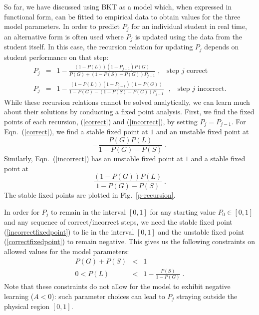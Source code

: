 \documentclass{acmlarge-edm}
\begin{document}
So far, we have discussed using BKT as a model which, when expressed
in functional form, can be fitted to empirical data to obtain values
for the three model parameters.  In order to predict $P_j$ for an
individual student in real time, an alternative form is often used where
$P_j$ is updated using the data from the student itself.
In this case, the recursion relation for updating $P_j$ 
\cite{corbett_knowledge_1994,baker_more_2008} depends on
student performance on that step:
%
\begin{eqnarray}
       P_j &=&
       1-\frac{\left(1-P(L)\right)\left(1-P_{j-1}\right)P(G)}{P(G)+\left(1-P(S)-P(G)\right)
         P_{j-1}}  \mbox{~,~~ step $j$ correct} \label{correct}\\
       P_j &=& 1-\frac{\left(1-P(L)\right)\left(1-P_{j-1}\right)\left(1-P(G)\right)}
                                 {1-P(G)-\left(1-P(S)-P(G)\right) P_{j-1}}
                        \mbox{~ ,~~ step $j$ incorrect.} \label{incorrect}
\end{eqnarray}
%
While these recursion relations cannot be solved analytically, we
can learn much about their solutions by conducting a fixed point analysis.
First, we find the fixed points of each recursion, (\ref{correct}) and
(\ref{incorrect}), by setting $P_j=P_{j-1}$.  For Eqn.~(\ref{correct}), we
find a stable fixed point at $1$ and an unstable fixed point at
\begin{equation}
    - \frac{P(G) P(L)}{1-P(G)-P(S)} \; .
      \label{correctfixedpoint}
\end{equation}
Similarly, Eqn.~(\ref{incorrect}) has an unstable fixed point at $1$
and a stable fixed point at
\begin{equation}
    \frac{\left(1-P(G)\right) P(L)}{1-P(G)-P(S)} \; . 
       \label{incorrectfixedpoint}
\end{equation}
The stable fixed points are plotted in Fig.~\ref{p-recursion}.

In order for $P_j$ to remain in the interval $\left[0,1\right]$ 
for any starting value $P_0\in \left[0,1\right]$ and any sequence of 
correct/incorrect steps, 
we need the stable fixed point (\ref{incorrectfixedpoint})
to lie in the interval $\left[0,1\right]$ and the unstable fixed point 
(\ref{correctfixedpoint}) to remain negative.  This gives us the following
constraints on allowed values for the model parameters:
%
\begin{eqnarray}
        P(G)+P(S)&<& 1 \\
        0 < P(L) &<& 1-\frac{P(S)}{1-P(G)}  \; .
        \label{bigconstraint}
\end{eqnarray}
%
Note that these constraints do not allow for the model to
exhibit negative learning ($A<0$):  such parameter
choices can lead to $P_j$ straying outside the physical
region $\left[0,1\right]$.
\end{document}
